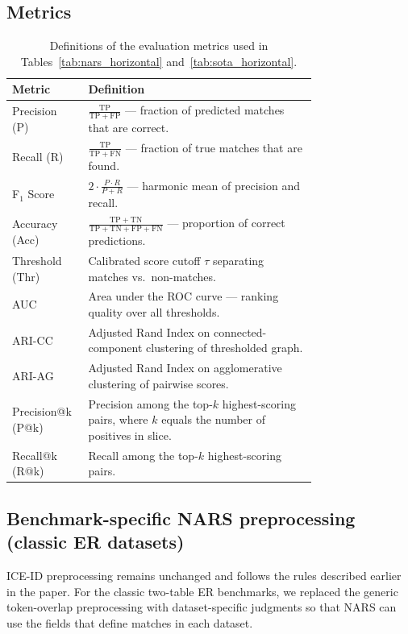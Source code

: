 \documentclass{article}
\begin{document}
\subsection{Metrics}
\begin{table}[H]
  \centering
  \small
  \begin{tabular}{lp{0.75\linewidth}}
    \toprule
    \textbf{Metric} & \textbf{Definition} \\
    \midrule
    Precision (P)  
      & $\displaystyle \frac{\mathrm{TP}}{\mathrm{TP} + \mathrm{FP}}$  
      — fraction of predicted matches that are correct. \\[0.3em]
    Recall (R)     
      & $\displaystyle \frac{\mathrm{TP}}{\mathrm{TP} + \mathrm{FN}}$  
      — fraction of true matches that are found. \\[0.3em]
    F$_1$ Score    
      & $2 \cdot \frac{P \cdot R}{P + R}$  
      — harmonic mean of precision and recall. \\[0.3em]
    Accuracy (Acc) 
      & $\displaystyle \frac{\mathrm{TP} + \mathrm{TN}}{\mathrm{TP} + \mathrm{TN} + \mathrm{FP} + \mathrm{FN}}$  
      — proportion of correct predictions. \\[0.3em]
    Threshold (Thr)
      & Calibrated score cutoff $\tau$ separating matches vs.\ non-matches. \\[0.3em]
    AUC           
      & Area under the ROC curve — ranking quality over all thresholds. \\[0.3em]
    ARI-CC        
      & Adjusted Rand Index on connected-component clustering of thresholded graph. \\[0.3em]
    ARI-AG        
      & Adjusted Rand Index on agglomerative clustering of pairwise scores. \\[0.3em]
    Precision@k (P@k) 
      & Precision among the top-$k$ highest-scoring pairs, where $k$ equals the number of positives in slice. \\[0.3em]
    Recall@k (R@k)    
      & Recall among the top-$k$ highest-scoring pairs. \\
    \bottomrule
  \end{tabular}
  \caption{Definitions of the evaluation metrics used in Tables~\ref{tab:nars_horizontal} and~\ref{tab:sota_horizontal}.}
  \label{tab:metric_definitions}
\end{table}

\subsection{Benchmark-specific NARS preprocessing (classic ER datasets)}
ICE-ID preprocessing remains unchanged and follows the rules described earlier in the paper. For the classic two-table ER benchmarks, we replaced the generic token-overlap preprocessing with dataset-specific judgments so that NARS can use the fields that define matches in each dataset.
\end{document}
